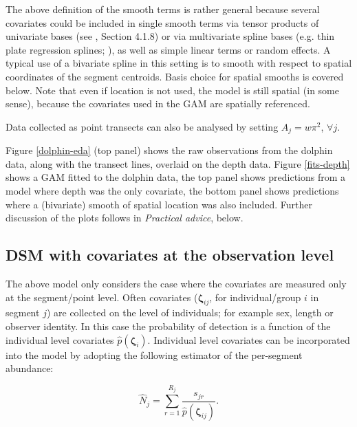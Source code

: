 \documentclass[a4paper,12pt]{article}
\begin{document}
The above definition of the smooth terms is rather general because several covariates could be included in single smooth terms via tensor products of univariate bases (see \cite{Wood:2006wz}, Section 4.1.8) or via multivariate spline bases (e.g. thin plate regression splines; \cite{Wood:2003tc}), as well as simple linear terms or random effects. A typical use of a bivariate spline in this setting is to smooth with respect to spatial coordinates of the segment centroids. Basis choice for spatial smooths is covered below. Note that even if location is not used, the model is still spatial (in some sense), because the covariates used in the GAM are spatially referenced.

Data collected as point transects can also be analysed by setting $A_j=w\pi^2$, $\forall j$.

Figure \ref{dolphin-eda} (top panel) shows the raw observations from the dolphin data, along with the transect lines, overlaid on the depth data. Figure \ref{fits-depth} shows a GAM fitted to the dolphin data, the top panel shows predictions from a model where depth was the only covariate, the bottom panel shows predictions where a (bivariate) smooth of spatial location was also included. Further discussion of the plots follows in \textit{Practical advice}, below.

\subsection*{DSM with covariates at the observation level}

The above model only considers the case where the covariates are measured only at the segment/point level. Often covariates ($\bm{\zeta}_{ij}$, for individual/group $i$ in segment $j$) are collected on the level of individuals; for example sex, length or observer identity. In this case the probability of detection is a function of the individual level covariates $\hat{p}(\bm{\zeta}_i)$. Individual level covariates can be incorporated into the model by adopting the following estimator of the per-segment abundance:

\begin{equation*}
\hat{N}_j = \sum_{r=1}^{R_j} \frac{s_{jr}}{\hat{p}(\bm{\zeta}_{ij})}.
\end{equation*}


\end{document}

